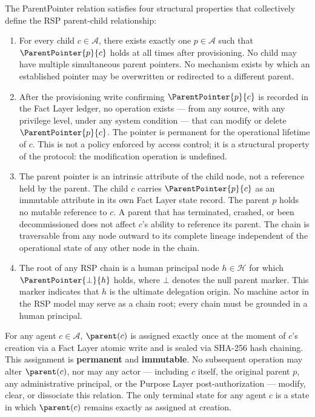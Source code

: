 The ParentPointer relation satisfies four structural properties that collectively define the RSP parent-child relationship:

\begin{enumerate}
    \item[(P1) \textbf{Uniqueness}] For every child $c \in \mathcal{A}$, there exists exactly one $p \in \mathcal{A}$ such that $\ParentPointer{p}{c}$ holds at all times after provisioning. No child may have multiple simultaneous parent pointers. No mechanism exists by which an established pointer may be overwritten or redirected to a different parent.

    \item[(P2) \textbf{Immutability}] After the provisioning write confirming $\ParentPointer{p}{c}$ is recorded in the Fact Layer ledger, no operation exists — from any source, with any privilege level, under any system condition — that can modify or delete $\ParentPointer{p}{c}$. The pointer is permanent for the operational lifetime of $c$. This is not a policy enforced by access control; it is a structural property of the protocol: the modification operation is undefined.

    \item[(P3) \textbf{Directionality}] The parent pointer is an intrinsic attribute of the child node, not a reference held by the parent. The child $c$ carries $\ParentPointer{p}{c}$ as an immutable attribute in its own Fact Layer state record. The parent $p$ holds no mutable reference to $c$. A parent that has terminated, crashed, or been decommissioned does not affect $c$'s ability to reference its parent. The chain is traversable from any node outward to its complete lineage independent of the operational state of any other node in the chain.

    \item[(P4) \textbf{Human Anchor Termination}] The root of any RSP chain is a human principal node $h \in \mathcal{H}$ for which $\ParentPointer{\bot}{h}$ holds, where $\bot$ denotes the null parent marker. This marker indicates that $h$ is the ultimate delegation origin. No machine actor in the RSP model may serve as a chain root; every chain must be grounded in a human principal.
\end{enumerate}

\begin{invariant}
\label{inv:pp_immutability}
For any agent $c \in \mathcal{A}$, $\parent(c)$ is assigned exactly once at the moment of $c$'s creation via a Fact Layer atomic write and is sealed via SHA-256 hash chaining. This assignment is \textbf{permanent} and \textbf{immutable}. No subsequent operation may alter $\parent(c)$, nor may any actor — including $c$ itself, the original parent $p$, any administrative principal, or the Purpose Layer post-authorization — modify, clear, or dissociate this relation. The only terminal state for any agent $c$ is a state in which $\parent(c)$ remains exactly as assigned at creation.
\end{invariant}

